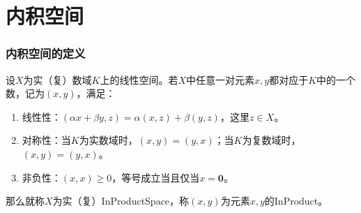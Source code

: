 \section{内积空间}

\subsubsection{内积空间的定义}
\begin{definition}\label{def:InProductSpace}
	设$X$为实（复）数域$K$上的线性空间。若$X$中任意一对元素$x,y$都对应于$K$中的一个数，记为$(x,y)$，满足：
	\begin{enumerate}
		\item 线性性：$(\alpha x+\beta y,z)=\alpha(x,z)+\beta(y,z)$，这里$z\in X$。
		\item 对称性：当$K$为实数域时，$(x,y)=(y,x)$；当$K$为复数域时，$(x,y)=\overline{(y,x)}$。
		\item 非负性：$(x,x)\geqslant 0$，等号成立当且仅当$x=\mathbf{0}$。
	\end{enumerate}
	那么就称$X$为实（复）\gls{InProductSpace}，称$(x,y)$为元素$x,y$的\gls{InProduct}。
\end{definition}




